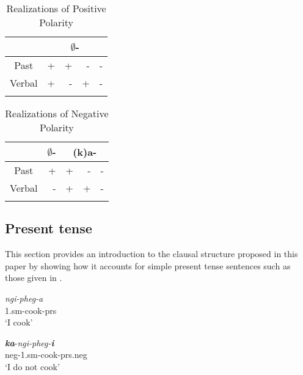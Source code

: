 \documentclass[output=paper]{langsci/langscibook}
\begin{document}
\begin{table}
\caption{Realizations of Positive Polarity} %
\centering %
\begin{tabular}{c| rrrr} %
\lsptoprule%
  &\multicolumn{4}{c}{$\emptyset$-} \\ [0.5ex] 
\midrule%
Past & + & + & - & -\\ %
Verbal & + & - & +& -\\[1ex] %
\lspbottomrule%
\end{tabular} 
\label{tab:hresult} 
\end{table} 

\begin{table}
\caption{Realizations of Negative Polarity} %
\centering %
\begin{tabular}{c| r|rrr} %
\lsptoprule%
 &\multicolumn{1}{c}{$\emptyset$-} &\multicolumn{3}{|c}{(k)a-} \\ [0.5ex] 
\midrule%
Past & + & + & - & -\\ %
Verbal & - & + & +& -\\[1ex] %
\lspbottomrule%
\end{tabular} 
\label{tab:hresult} 
\end{table} 






\subsection{Present tense}

This section provides an introduction to the clausal structure proposed in this paper by showing how it accounts for simple present tense sentences such as those given in .
 

\begin{exe}
\ex \begin{xlist}
\ex \gll  \textit{ngi-pheg-a}\\
          1.{\sc sm}-cook-\sc prs\\
    \glt `I cook'





\ex \gll  \textit{\textbf{ka}}-\textit{ngi-pheg-\textbf{i}}\\
          {\sc neg}-1.{\sc sm}-cook-{\sc prs.neg}\\
    \glt `I do not cook'
\end{xlist}
\end{exe}
 
\end{document}
